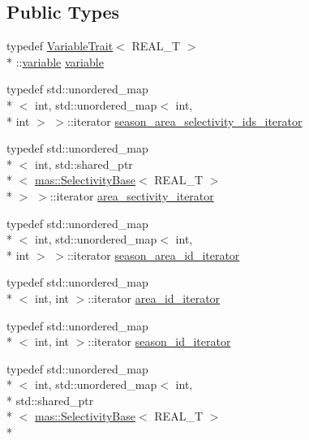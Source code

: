 \subsection*{Public Types}
\begin{DoxyCompactItemize}
\item 
typedef \hyperlink{structmas_1_1_variable_trait}{Variable\-Trait}$<$ R\-E\-A\-L\-\_\-\-T $>$\\*
\-::\hyperlink{structmas_1_1_fleet_a1902d0842cb7ce9b9bdd4be013e709a9}{variable} \hyperlink{structmas_1_1_fleet_a1902d0842cb7ce9b9bdd4be013e709a9}{variable}
\item 
typedef std\-::unordered\-\_\-map\\*
$<$ int, std\-::unordered\-\_\-map$<$ int, \\*
int $>$ $>$\-::iterator \hyperlink{structmas_1_1_fleet_aadb49821d696137325793eec3abdde87}{season\-\_\-area\-\_\-selectivity\-\_\-ids\-\_\-iterator}
\item 
typedef std\-::unordered\-\_\-map\\*
$<$ int, std\-::shared\-\_\-ptr\\*
$<$ \hyperlink{structmas_1_1_selectivity_base}{mas\-::\-Selectivity\-Base}$<$ R\-E\-A\-L\-\_\-\-T $>$\\*
 $>$ $>$\-::iterator \hyperlink{structmas_1_1_fleet_a7754c30a6a70e4bac646b59fb93db23e}{area\-\_\-sectivity\-\_\-iterator}
\item 
typedef std\-::unordered\-\_\-map\\*
$<$ int, std\-::unordered\-\_\-map$<$ int, \\*
int $>$ $>$\-::iterator \hyperlink{structmas_1_1_fleet_ad3f5709dbe6c7d4b2d9082783272a48a}{season\-\_\-area\-\_\-id\-\_\-iterator}
\item 
typedef std\-::unordered\-\_\-map\\*
$<$ int, int $>$\-::iterator \hyperlink{structmas_1_1_fleet_ac0ff17aa69ffb817ba0d36aa19b42277}{area\-\_\-id\-\_\-iterator}
\item 
typedef std\-::unordered\-\_\-map\\*
$<$ int, int $>$\-::iterator \hyperlink{structmas_1_1_fleet_a28ea634c7029c6e00c6362c152d0ac7a}{season\-\_\-id\-\_\-iterator}
\item 
typedef std\-::unordered\-\_\-map\\*
$<$ int, std\-::unordered\-\_\-map$<$ int, \\*
std\-::shared\-\_\-ptr\\*
$<$ \hyperlink{structmas_1_1_selectivity_base}{mas\-::\-Selectivity\-Base}$<$ R\-E\-A\-L\-\_\-\-T $>$\\*

\end{DoxyCompactItemize}
